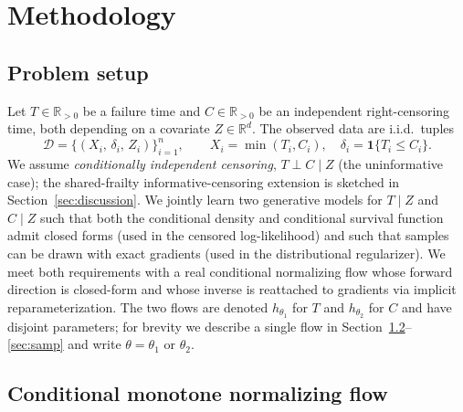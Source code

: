 \section{Methodology}
\label{sec:method}

\subsection{Problem setup}
\label{sec:setup}

Let $T \in \mathbb{R}_{>0}$ be a failure time and $C \in \mathbb{R}_{>0}$ be
an independent right-censoring time, both depending on a covariate
$Z \in \mathbb{R}^{d}$. The observed data are i.i.d.\ tuples
\[
    \mathcal{D} = \{(X_i,\, \delta_i,\, Z_i)\}_{i=1}^{n},
    \qquad
    X_i = \min(T_i, C_i),
    \quad
    \delta_i = \mathbf{1}\{T_i \le C_i\}.
\]
We assume \emph{conditionally independent censoring}, $T \perp C \mid Z$
(the uninformative case); the shared-frailty informative-censoring extension
is sketched in Section~\ref{sec:discussion}. We jointly learn two generative
models for $T \mid Z$ and $C \mid Z$ such that both the conditional density
and conditional survival function admit closed forms (used in the censored
log-likelihood) and such that samples can be drawn with exact gradients (used
in the distributional regularizer). We meet both requirements with a real
conditional normalizing flow whose forward direction is closed-form and whose
inverse is reattached to gradients via implicit reparameterization. The two
flows are denoted $h_{\theta_1}$ for $T$ and $h_{\theta_2}$ for $C$ and have
disjoint parameters; for brevity we describe a single flow in
Section~\ref{sec:flow}--\ref{sec:samp} and write $\theta = \theta_1$ or
$\theta_2$.

\subsection{Conditional monotone normalizing flow}
\label{sec:flow}

